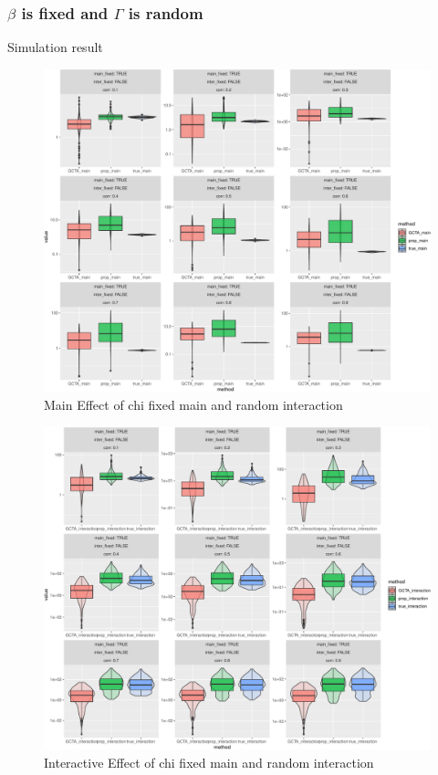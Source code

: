 \documentclass[]{article}
\begin{document}
\clearpage

\subsubsection{\texorpdfstring{\(\beta\) is fixed and \(\Gamma\) is
random}{\textbackslash{}beta is fixed and \textbackslash{}Gamma is random}}\label{beta-is-fixed-and-gamma-is-random-1}

Simulation result

\begin{figure}
\centering
\includegraphics{Simulation_report_files/figure-latex/main_fixed_random_chi-1.pdf}
\caption{Main Effect of chi fixed main and random interaction}
\end{figure}

\begin{figure}
\centering
\includegraphics{Simulation_report_files/figure-latex/inter_fixed_random_chi-1.pdf}
\caption{Interactive Effect of chi fixed main and random interaction}
\end{figure}
\end{document}
